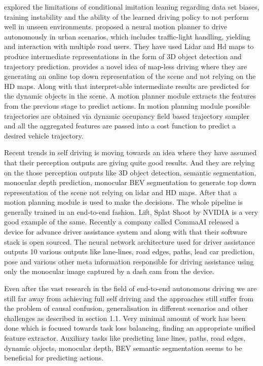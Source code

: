 \cite{DBLP:journals/corr/abs-1904-08980} explored the limitations of conditional imitation leaning regarding data set biases, training instability and the ability of the learned driving policy to not perform well in unseen environments. \cite{DBLP:journals/corr/abs-2101-06679} proposed a neural motion planner to drive autonomously in urban scenarios, which includes traffic-light handling, yielding and interaction with multiple road users. They have used Lidar and Hd maps to produce intermediate representations in the form of 3D object detection and trajectory prediction. \cite{Casas_2021_CVPR} provides a novel idea of map-less driving where they are generating an online top down representation of the scene and not relying on the HD maps. Along with that interpret-able intermediate results are predicted for the dynamic objects in the scene. A motion planner module extracts the features from the previous stage to predict actions. In motion planning module possible trajectories are obtained via dynamic occupancy field based trajectory sampler and all the aggregated features are passed into a cost function to predict a desired vehicle trajectory. 

Recent trends in self driving is moving towards an idea where they have assumed that their perception outputs are giving quite good results. And they are relying on the those perception outputs like 3D object detection, semantic segmentation, monocular depth prediction, monocular BEV segmentation to generate top down representation of the scene not relying on lidar and HD maps. After that a motion planning module is used to make the decisions. The whole pipeline is generally trained in an end-to-end fashion. Lift, Splat Shoot \cite{DBLP:journals/corr/abs-2008-05711} by NVIDIA is a very good example of the same. Recently a company called CommaAI released a device for advance driver assistance system and along with that their software stack is open sourced. The neural network architecture used for driver assistance outputs 10 various outputs like lane-lines, road edges, paths, lead car prediction, pose and various other meta information responsible for driving assistance using only the monocular image captured by a dash cam from the device. 

Even after the vast research in the field of end-to-end autonomous driving we are still far away from achieving full self driving and the approaches still suffer from the problem of causal confusion, generalisation in different scenarios and other challenges as described in section 1.1. Very minimal amount of work has been done which is focused towards task loss balancing, finding an appropriate unified feature extractor. Auxiliary tasks like predicting lane lines, paths, road edges, dynamic objects, monocular depth, BEV semantic segmentation seems to be beneficial for predicting actions.

